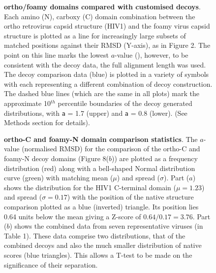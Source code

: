 \begin{figure}
\centering
{}
\begin{footnotesize}
\caption{
\label{Fig:sapit}
{\bf ortho/foamy domains compared with customised decoys}.
Each amino (N), carboxy (C) domain combination between the ortho retrovirus capsid structure (HIV1)
and the foamy virus capsid structure is plotted as a line for increasingly large subsets of matched
positions against their RMSD (Y-axis), as in Figure 2.  The point on this line marks the lowest
$a$-value (), however, to be consistent with the decoy data, the full alignment length
was used.  The decoy comparison data (blue) is plotted in a variety of symbols
with each representing a different combination of decoy construction.  The dashed blue lines
(which are the same in all plots) mark the approximate 10$^{th}$ percentile boundaries of
the decoy generated distributions,  with {\tt a} = 1.7 (upper) and  {\tt a} = 0.8 (lower). 
(See Methods section for details).
}
\end{footnotesize}
\end{figure}

\begin{figure}
\centering
{}
\begin{footnotesize}
\caption{
\label{Fig:norms}
{\bf ortho-C and foamy-N domain comparison statistics}.
The $a$-value (normalised RMSD) for the comparison of the ortho-C and foamy-N decoy domains
(Figure 8($b$)) are plotted as a frequency distribution (red) along with a bell-shaped
Normal distribution curve (green) with matching mean ($\mu$) and spread ($\sigma$).
Part ($a$) shows the distribution for the HIV1 C-terminal domain ($\mu = 1.23$) and spread ($\sigma = 0.17$)
with the position of the native structure comparison plotted as a blue (inverted) triangle.  
Its position lies 0.64 units below the mean giving a Z-score of $0.64/0.17 = 3.76$.
Part ($b$) shows the combined data from seven representative viruses (in Table 1).
These data comprise two distributions, that of the combined decoys and also the much smaller
distribution of native scores (blue triangles).   This allows a T-test to be made on the
significance of their separation.
}
\end{footnotesize}
\end{figure}


